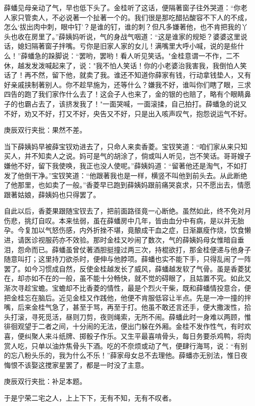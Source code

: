 \begin{parag}
薛蟠见母亲动了气，早也低下头了。金桂听了这话，便隔著窗子往外哭道：“你老人家只管卖人，不必说著一个扯著一个的。我们很是那吃醋拈酸容不下人的不成，怎么‘拔出肉中刺，眼中钉’？是谁的钉，谁的刺？但凡多嫌著他，也不肯把我的丫头也收在房里了。”薛姨妈听说，气的身战气咽道：“这是谁家的规矩？婆婆这里说话，媳妇隔著窗子拌嘴。亏你是旧家人家的女儿！满嘴里大呼小喊，说的是些什么！”薛蟠急的跺脚说：“罢哟，罢哟！看人听见笑话。"金桂意谓一不作，二不休，越发发泼喊起来了，说："我不怕人笑话！你的小老婆治我害我，我倒怕人笑话了！再不然，留下他，就卖了我。谁还不知道你薛家有钱，行动拿钱垫人，又有好亲戚挟制著别人。你不趁早施为，还等什么？嫌我不好，谁叫你们瞎了眼，三求四告的跑了我们家作什么去了！这会子人也来了，金的银的也赔了，略有个眼睛鼻子的也霸占去了，该挤发我了！"一面哭喊，一面滚揉，自己拍打。薛蟠急的说又不好，劝又不好，打又不好，央告又不好，只是出入咳声叹气，抱怨说运气不好。\begin{note}庚辰双行夹批：果然不差。\end{note}当下薛姨妈早被薛宝钗劝进去了，只命人来卖香菱。宝钗笑道：“咱们家从来只知买人，并不知卖人之说。妈可是气的胡涂了，倘或叫人听见，岂不笑话。哥哥嫂子嫌他不好，留下我使唤，我正也没人使呢。”薛姨妈道：“留著他还是淘气，不如打发了他倒干净。”宝钗笑道：“他跟著我也是一样，横竖不叫他到前头去。从此断绝了他那里，也如卖了一般。”香菱早已跑到薛姨妈跟前痛哭哀求，只不愿出去，情愿跟著姑娘，薛姨妈也只得罢了。
\end{parag}


\begin{parag}


    自此以后，香菱果跟随宝钗去了，把前面路径竟一心断绝。虽然如此，终不免对月伤悲，挑灯自叹。本来怯弱，虽在薛蟠房中几年，皆由血分中有病，是以并无胎孕。今复加以气怒伤感，内外折挫不堪，竟酿成干血之症，日渐羸瘦作烧，饮食懒进，请医诊视服药亦不效验。那时金桂又吵闹了数次，气的薛姨妈母女惟暗自垂泪，怨命而已。薛蟠虽曾仗著酒胆挺撞过两三次，持棍欲打，那金桂便递与他身子随意叫打；这里持刀欲杀时，便伸与他脖项。薛蟠也实不能下手，只得乱闹了一阵罢了。如今习惯成自然，反使金桂越发长了威风，薛蟠越发软了气骨。虽是香菱犹在，却亦如不在的一般，虽不能十分畅快，就不觉的碍眼了，且姑置不究。如此又渐次寻趁宝蟾。宝蟾却不比香菱的情性，最是个烈火干柴，既和薛蟠情投意合，便把金桂忘在脑后。近见金桂又作践他，他便不肯服低容让半点。先是一冲一撞的拌嘴，后来金桂气急了，甚至于骂，再至于打。他虽不敢还言还手，便大撒泼性，拾头打滚，寻死觅活，昼则刀剪，夜则绳索，无所不闹。薛蟠此时一身难以两顾，惟徘徊观望于二者之间，十分闹的无法，便出门躲在外厢。金桂不发作性气，有时欢喜，便纠聚人来斗纸牌、掷骰子作乐。又生平最喜啃骨头，每日务要杀鸡鸭，将肉赏人吃，只单以油炸焦骨头下酒。吃的不奈烦或动了气，便肆行海骂，说：“有别的忘八粉头乐的，我为什么不乐！”薛家母女总不去理他。薛蟠亦无别法，惟日夜悔恨不该娶这搅家星罢了，都是一时没了主意。\begin{note}庚辰双行夹批：补足本题。\end{note}于是宁荣二宅之人，上上下下，无有不知，无有不叹者。
\end{parag}


